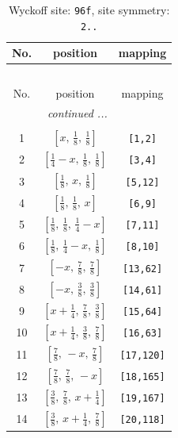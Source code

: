 \documentclass[fleqn,8pt]{jsarticle}
\begin{document}
\begin{longtable}{ccc}
\caption{Wyckoff site: {\tt 96f}, site symmetry: {\tt 2..}}
 \\
 \hline \hline
No. & position & mapping \\ \hline \endfirsthead

\multicolumn{2}{l}{\tablename\ \thetable{}} \\
 \hline \hline
No. & position & mapping \\ \hline \endhead

 \hline \hline
\multicolumn{2}{r}{\footnotesize\it continued ...} \\ \endfoot

 \hline \hline
\multicolumn{2}{r}{} \\ \endlastfoot

1 & $\left[ x,\, \frac{1}{8},\, \frac{1}{8} \right]$ & {\tt [1,2]} \\ \hline
2 & $\left[ \frac{1}{4} - x,\, \frac{1}{8},\, \frac{1}{8} \right]$ & {\tt [3,4]} \\ \hline
3 & $\left[ \frac{1}{8},\, x,\, \frac{1}{8} \right]$ & {\tt [5,12]} \\ \hline
4 & $\left[ \frac{1}{8},\, \frac{1}{8},\, x \right]$ & {\tt [6,9]} \\ \hline
5 & $\left[ \frac{1}{8},\, \frac{1}{8},\, \frac{1}{4} - x \right]$ & {\tt [7,11]} \\ \hline
6 & $\left[ \frac{1}{8},\, \frac{1}{4} - x,\, \frac{1}{8} \right]$ & {\tt [8,10]} \\ \hline
7 & $\left[ - x,\, \frac{7}{8},\, \frac{7}{8} \right]$ & {\tt [13,62]} \\ \hline
8 & $\left[ - x,\, \frac{3}{8},\, \frac{3}{8} \right]$ & {\tt [14,61]} \\ \hline
9 & $\left[ x + \frac{1}{4},\, \frac{7}{8},\, \frac{3}{8} \right]$ & {\tt [15,64]} \\ \hline
10 & $\left[ x + \frac{1}{4},\, \frac{3}{8},\, \frac{7}{8} \right]$ & {\tt [16,63]} \\ \hline
11 & $\left[ \frac{7}{8},\, - x,\, \frac{7}{8} \right]$ & {\tt [17,120]} \\ \hline
12 & $\left[ \frac{7}{8},\, \frac{7}{8},\, - x \right]$ & {\tt [18,165]} \\ \hline
13 & $\left[ \frac{3}{8},\, \frac{7}{8},\, x + \frac{1}{4} \right]$ & {\tt [19,167]} \\ \hline
14 & $\left[ \frac{3}{8},\, x + \frac{1}{4},\, \frac{7}{8} \right]$ & {\tt [20,118]} \\ \hline

\end{longtable}
\end{document}
